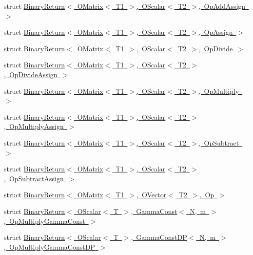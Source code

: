 \begin{DoxyCompactItemize}
\item 
struct \mbox{\hyperlink{structENSEM_1_1BinaryReturn_3_01OMatrix_3_01T1_01_4_00_01OScalar_3_01T2_01_4_00_01OpAddAssign_01_4}{Binary\+Return$<$ O\+Matrix$<$ T1 $>$, O\+Scalar$<$ T2 $>$, Op\+Add\+Assign $>$}}
\item 
struct \mbox{\hyperlink{structENSEM_1_1BinaryReturn_3_01OMatrix_3_01T1_01_4_00_01OScalar_3_01T2_01_4_00_01OpAssign_01_4}{Binary\+Return$<$ O\+Matrix$<$ T1 $>$, O\+Scalar$<$ T2 $>$, Op\+Assign $>$}}
\item 
struct \mbox{\hyperlink{structENSEM_1_1BinaryReturn_3_01OMatrix_3_01T1_01_4_00_01OScalar_3_01T2_01_4_00_01OpDivide_01_4}{Binary\+Return$<$ O\+Matrix$<$ T1 $>$, O\+Scalar$<$ T2 $>$, Op\+Divide $>$}}
\item 
struct \mbox{\hyperlink{structENSEM_1_1BinaryReturn_3_01OMatrix_3_01T1_01_4_00_01OScalar_3_01T2_01_4_00_01OpDivideAssign_01_4}{Binary\+Return$<$ O\+Matrix$<$ T1 $>$, O\+Scalar$<$ T2 $>$, Op\+Divide\+Assign $>$}}
\item 
struct \mbox{\hyperlink{structENSEM_1_1BinaryReturn_3_01OMatrix_3_01T1_01_4_00_01OScalar_3_01T2_01_4_00_01OpMultiply_01_4}{Binary\+Return$<$ O\+Matrix$<$ T1 $>$, O\+Scalar$<$ T2 $>$, Op\+Multiply $>$}}
\item 
struct \mbox{\hyperlink{structENSEM_1_1BinaryReturn_3_01OMatrix_3_01T1_01_4_00_01OScalar_3_01T2_01_4_00_01OpMultiplyAssign_01_4}{Binary\+Return$<$ O\+Matrix$<$ T1 $>$, O\+Scalar$<$ T2 $>$, Op\+Multiply\+Assign $>$}}
\item 
struct \mbox{\hyperlink{structENSEM_1_1BinaryReturn_3_01OMatrix_3_01T1_01_4_00_01OScalar_3_01T2_01_4_00_01OpSubtract_01_4}{Binary\+Return$<$ O\+Matrix$<$ T1 $>$, O\+Scalar$<$ T2 $>$, Op\+Subtract $>$}}
\item 
struct \mbox{\hyperlink{structENSEM_1_1BinaryReturn_3_01OMatrix_3_01T1_01_4_00_01OScalar_3_01T2_01_4_00_01OpSubtractAssign_01_4}{Binary\+Return$<$ O\+Matrix$<$ T1 $>$, O\+Scalar$<$ T2 $>$, Op\+Subtract\+Assign $>$}}
\item 
struct \mbox{\hyperlink{structENSEM_1_1BinaryReturn_3_01OMatrix_3_01T1_01_4_00_01OVector_3_01T2_01_4_00_01Op_01_4}{Binary\+Return$<$ O\+Matrix$<$ T1 $>$, O\+Vector$<$ T2 $>$, Op $>$}}
\item 
struct \mbox{\hyperlink{structENSEM_1_1BinaryReturn_3_01OScalar_3_01T_01_4_00_01GammaConst_3_01N_00_01m_01_4_00_01OpMultiplyGammaConst_01_4}{Binary\+Return$<$ O\+Scalar$<$ T $>$, Gamma\+Const$<$ N, m $>$, Op\+Multiply\+Gamma\+Const $>$}}
\item 
struct \mbox{\hyperlink{structENSEM_1_1BinaryReturn_3_01OScalar_3_01T_01_4_00_01GammaConstDP_3_01N_00_01m_01_4_00_01OpMultiplyGammaConstDP_01_4}{Binary\+Return$<$ O\+Scalar$<$ T $>$, Gamma\+Const\+D\+P$<$ N, m $>$, Op\+Multiply\+Gamma\+Const\+D\+P $>$}}

\end{DoxyCompactItemize}

